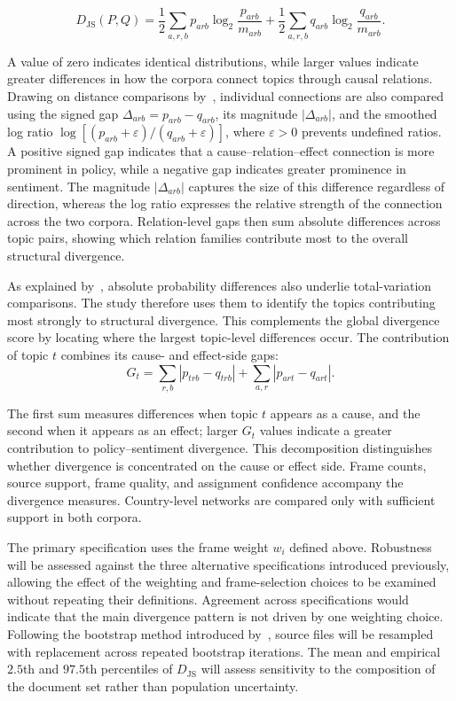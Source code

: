 \begin{equation}
D_{\mathrm{JS}}(P,Q)
=
\frac{1}{2}
\sum_{a,r,b}
p_{arb}\log_2\frac{p_{arb}}{m_{arb}}
+
\frac{1}{2}
\sum_{a,r,b}
q_{arb}\log_2\frac{q_{arb}}{m_{arb}}.
\label{eq:method-frame-js}
\end{equation}

A value of zero indicates identical distributions, while larger values indicate
greater differences in how the corpora connect topics through causal relations.
Drawing on distance comparisons by~\cite{gibbs2002choosing}, individual connections
are also compared using the signed gap $\Delta_{arb}=p_{arb}-q_{arb}$, its magnitude
$|\Delta_{arb}|$, and the smoothed log ratio
$\log[(p_{arb}+\varepsilon)/(q_{arb}+\varepsilon)]$, where $\varepsilon>0$ prevents
undefined ratios. A positive signed gap indicates that a cause--relation--effect
connection is more prominent in policy, while a negative gap indicates greater
prominence in sentiment. The magnitude $|\Delta_{arb}|$ captures the size of this
difference regardless of direction, whereas the log ratio expresses the relative
strength of the connection across the two corpora. Relation-level gaps then sum
absolute differences across topic pairs, showing which relation families contribute
most to the overall structural divergence.


As explained by~\cite{gibbs2002choosing}, absolute probability differences also
underlie total-variation comparisons. The study therefore uses them to identify the
topics contributing most strongly to structural divergence. This complements the
global divergence score by locating where the largest topic-level differences occur.
The contribution of topic $t$ combines its cause- and effect-side gaps:
\begin{equation}
G_t
=
\sum_{r,b}|p_{trb}-q_{trb}|
+
\sum_{a,r}|p_{art}-q_{art}|.
\label{eq:method-topic-gap}
\end{equation}

The first sum measures differences when topic $t$ appears as a cause, and the second
when it appears as an effect; larger $G_t$ values indicate a greater contribution to
policy--sentiment divergence. This decomposition distinguishes whether divergence is
concentrated on the cause or effect side. Frame counts, source support, frame
quality, and assignment confidence accompany the divergence measures. Country-level
networks are compared only with sufficient support in both corpora.

The primary specification uses the frame weight $w_i$ defined above. Robustness will
be assessed against the three alternative specifications introduced previously,
allowing the effect of the weighting and frame-selection choices to be examined
without repeating their definitions. Agreement across specifications would indicate
that the main divergence pattern is not driven by one weighting choice. Following the
bootstrap method introduced by~\cite{efron1979bootstrap}, source files will be
resampled with replacement across repeated bootstrap iterations. The mean and
empirical $2.5$th and $97.5$th percentiles of $D_{\mathrm{JS}}$ will assess
sensitivity to the composition of the document set rather than population
uncertainty.


